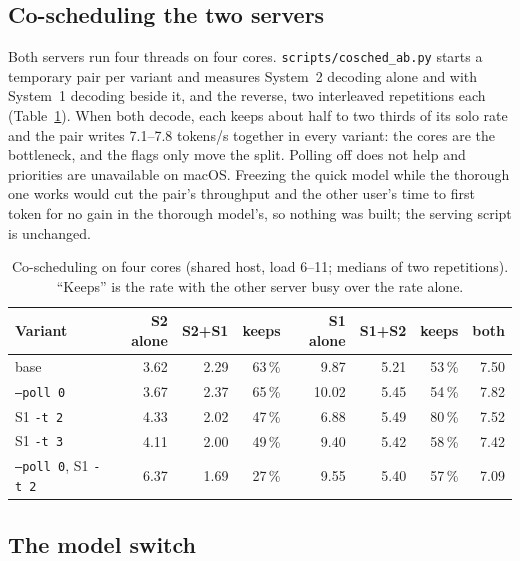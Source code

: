 \subsection{Co-scheduling the two servers}
\label{sec:p14-cosched}

Both servers run four threads on four cores. \texttt{scripts/cosched\_ab.py} starts a temporary pair per variant and measures
System~2 decoding alone and with System~1 decoding beside it, and the reverse, two interleaved repetitions each
(Table~\ref{tab:p14-cosched}). When both decode, each keeps about half to two thirds of its solo rate and the pair writes
7.1--7.8 tokens/s together in every variant: the cores are the bottleneck, and the flags only move the split. Polling off does
not help and priorities are unavailable on macOS. Freezing the quick model while the thorough one works would cut the pair's
throughput and the other user's time to first token for no gain in the thorough model's, so nothing was built; the serving
script is unchanged.

\begin{table}[t]
\centering
\caption{Co-scheduling on four cores (shared host, load 6--11; medians of two repetitions). ``Keeps'' is the rate with the
other server busy over the rate alone.}
\label{tab:p14-cosched}
\scriptsize
\begin{tabular}{@{}lrrrrrrr@{}}
\toprule
Variant & S2 alone & S2+S1 & keeps & S1 alone & S1+S2 & keeps & both \\
\midrule
base & 3.62 & 2.29 & 63\,\% & 9.87 & 5.21 & 53\,\% & 7.50 \\
\texttt{--poll 0} & 3.67 & 2.37 & 65\,\% & 10.02 & 5.45 & 54\,\% & 7.82 \\
S1 \texttt{-t 2} & 4.33 & 2.02 & 47\,\% & 6.88 & 5.49 & 80\,\% & 7.52 \\
S1 \texttt{-t 3} & 4.11 & 2.00 & 49\,\% & 9.40 & 5.42 & 58\,\% & 7.42 \\
\texttt{--poll 0}, S1 \texttt{-t 2} & 6.37 & 1.69 & 27\,\% & 9.55 & 5.40 & 57\,\% & 7.09 \\
\bottomrule
\end{tabular}
\end{table}

\subsection{The model switch}
\label{sec:p14-switch}

